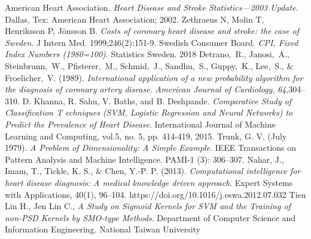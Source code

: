 \documentclass[conference]{IEEEtran}
\begin{document}
\begin{thebibliography}{1}

	American Heart Association. \emph{Heart Disease and Stroke Statistics—2003
		Update}. Dallas, Tex: American Heart Association; 2002.
	Zethraeus N, Molin T, Henriksson P, Jönsson B. \emph{Costs of coronary heart disease and stroke: the case of Sweden}. J Intern Med. 1999;246(2):151-9.
	Swedish Consumer Board. \emph{CPI, Fixed Index Numbers (1980=100)}. Statistics Sweden. 2018
Detrano,~R., Janosi,~A., Steinbrunn,~W., Pfisterer,~M., Schmid,~J.,
       Sandhu,~S., Guppy,~K., Lee,~S., \& Froelicher,~V. (1989).  {\it 
       International application of a new probability algorithm for the 
       diagnosis of coronary artery disease.}  {\it American Journal of 
       Cardiology}, {\it 64},304--310.
	D. Khanna, R. Sahu, V. Baths, and B. Deshpande. \emph{Comparative Study of Classification T echniques (SVM, Logistic Regression and Neural Networks) to Predict the Prevalence of Heart Disease}. International Journal of Machine Learning and Computing, vol.5, no. 5, pp. 414-419, 2015.
	Trunk, G. V. (July 1979). \emph{A Problem of Dimensionality: A Simple Example}. IEEE Transactions on Pattern Analysis and Machine Intelligence. PAMI-1 (3): 306–307.
	Nahar, J., Imam, T., Tickle, K. S., \& Chen, Y.-P. P. (2013). \emph{Computational intelligence for heart disease diagnosis: A medical knowledge driven approach}. Expert Systems with Applications, 40(1), 96–104. https://doi.org/10.1016/j.eswa.2012.07.032 
	Tien Lin H., Jen Lin C., \emph{A Study on Sigmoid Kernels for SVM and the Training of non-PSD Kernels by SMO-type Methods}. Department of Computer Science and Information Engineering. National Taiwan University

\end{thebibliography}




\end{document}
